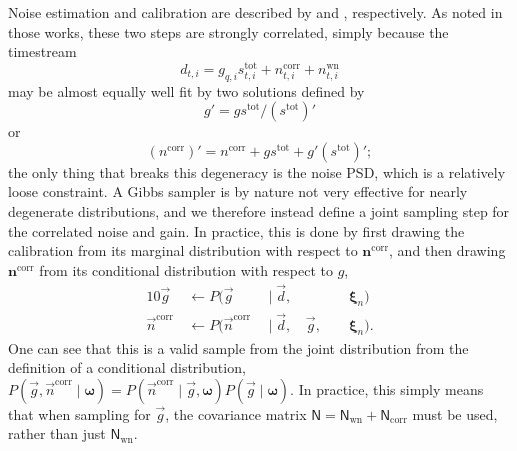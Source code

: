 \documentclass[twocolumn]{../../common/aa}
\newcommand{\g}[0]{\vec{g}}
\newcommand{\ncorr}{\vec n^\mathrm{corr}}
\newcommand{\data}{\vec d}
\begin{document}
Noise estimation and calibration are described by \citet{bp06} and \citet{bp07}, respectively. As noted in those works, these two steps are strongly correlated, simply because the timestream
\begin{equation}
	d_{t,i}=g_{q,i}s_{t,i}^\mathrm{tot}+n_{t,i}^\mathrm{corr}+n_{t,i}^\mathrm{wn}
\end{equation}
may be almost equally well fit by two solutions defined by
\begin{equation}
	g'=gs^\mathrm{tot}/(s^\mathrm{tot})'
\end{equation}
or 
\begin{equation}
	{(n^\mathrm{corr})'=n^\mathrm{corr}+gs^\mathrm{tot}+g'(s^\mathrm{tot})'};
\end{equation} the only thing that breaks this degeneracy is the noise PSD, which is a relatively loose constraint. A Gibbs sampler is by nature not very effective for nearly degenerate distributions, and we therefore instead define a joint sampling step for the correlated noise and gain. In practice, this is done by first drawing the calibration from its marginal distribution with respect to $\boldsymbol n^\mathrm{corr}$, and then drawing $\boldsymbol n^\mathrm{corr}$ from its conditional distribution with respect to $g$,
\begin{alignat}{10}
	\g&\,\leftarrow P(\g&\,\mid\data, &\, &\,&\,\boldsymbol\xi_n)
	\label{eq:gmarg}
	\\
	\ncorr&\,\leftarrow P(\ncorr&\,\mid\data, &\,\g, &\,&\,\boldsymbol\xi_n).
	\label{eq:ncorr_only}
\end{alignat}
One can see that this is a valid sample from the joint distribution from the definition of a conditional distribution, $P(\g,\ncorr\mid\boldsymbol\omega)=P(\ncorr\mid\g,\boldsymbol\omega)P(\g\mid\boldsymbol\omega)$. In practice, this simply means that when sampling for $\g$, the covariance matrix $\mathsf N=\mathsf N_\textrm{wn}+\mathsf N_\textrm{corr}$ must be used, rather than just $\mathsf N_\mathrm{wn}$.
\end{document}
